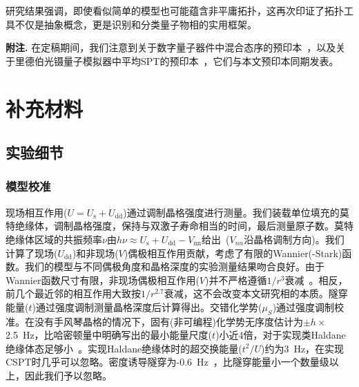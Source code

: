 \documentclass[preprint,superscriptaddress,floatfix, nofootinbib]{revtex4-2}
\begin{document}
\begin{CJK*}{UTF8}{gbsn}
研究结果强调，即使看似简单的模型也可能蕴含非平庸拓扑，这再次印证了拓扑工具不仅是抽象概念，更是识别和分类量子物相的实用框架。

\vspace{4pt}

\textbf{附注.} 在定稿期间，我们注意到关于数字量子器件中混合态序的预印本~\cite{Zhang2025}，以及关于里德伯光镊量子模拟器中平均SPT的预印本~\cite{Yue2025}，它们与本文预印本同期发表。
\section*{补充材料}


\subsection*{实验细节}


\subsubsection*{模型校准}

现场相互作用($U=U_\textrm{s}+U_\textrm{dd}$)通过调制晶格强度进行测量。我们装载单位填充的莫特绝缘体，调制晶格强度，保持与双激子寿命相当的时间，最后测量原子数。莫特绝缘体区域的共振频率$\nu$由$h\nu\approx U_\textrm{s}+U_\textrm{dd}-V_\textrm{nn}$给出~\cite{Chomaz2016}($V_{nn}$沿晶格调制方向)。我们计算了现场($U_\textrm{dd}$)和非现场($V$)偶极相互作用贡献，考虑了有限的Wannier(-Stark)函数。我们的模型与不同偶极角度和晶格深度的实验测量结果吻合良好。由于Wannier函数尺寸有限，非现场偶极相互作用($V$)并不严格遵循$1/r^3$衰减~\cite{Wall2013}。相反，前几个最近邻的相互作用大致按$1/r^{2.7}$衰减，这不会改变本文研究相的本质。隧穿能量($t$)通过强度调制测量晶格深度后计算得出。交错化学势($\mu_S$)通过强度调制校准。在没有手风琴晶格的情况下，固有(非可编程)化学势无序度估计为$\pm h\times$ 2.5~Hz，比哈密顿量中明确写出的最小能量尺度($t$)小近4倍，对于实现类Haldane绝缘体态足够小~\cite{Deng2013, Lv2018}。实现Haldane绝缘体时的超交换能量($t^2/U$)约为3~Hz，在实现CSPT时几乎可以忽略。密度诱导隧穿为-0.6~Hz~\cite{Baier2016}，比隧穿能量小一个数量级以上，因此我们予以忽略。


\end{CJK*}
\end{document}
